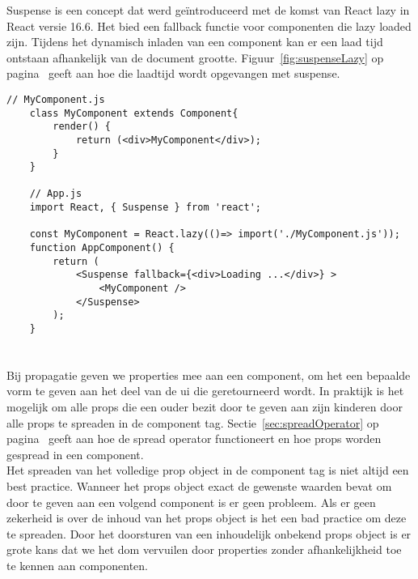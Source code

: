\subsubsection{}
\label{sec:suspens}

Suspense is een concept dat werd geïntroduceerd met de komst van React lazy in React versie 16.6. Het bied een fallback functie voor componenten die lazy loaded zijn. Tijdens het dynamisch inladen van een component kan er een laad tijd ontstaan afhankelijk van de document grootte. Figuur~\ref{fig:suspenseLazy} op pagina~\pageref{fig:suspenseLazy} geeft aan hoe die laadtijd wordt opgevangen met suspense.\\

\newpage
\begin{lstlisting}[caption=Lazy loading met suspense, label={fig:suspenseLazy}]
    // MyComponent.js
    class MyComponent extends Component{
        render() {
            return (<div>MyComponent</div>);
        }
    }
    
    // App.js
    import React, { Suspense } from 'react';
    
    const MyComponent = React.lazy(()=> import('./MyComponent.js'));
    function AppComponent() {
        return (
            <Suspense fallback={<div>Loading ...</div>} >
                <MyComponent />
            </Suspense>
        );
    }
\end{lstlisting}

\section{}
\label{sec:frameworkOplossingen}

\subsection{}
\label{sec:propagatie}

Bij propagatie geven we properties mee aan een component, om het een bepaalde vorm te geven aan het deel van de \gls{ui} die geretourneerd wordt. In praktijk is het mogelijk om alle props die een ouder bezit door te geven aan zijn kinderen door alle props te spreaden in de component tag. Sectie~\ref{sec:spreadOperator} op pagina~\pageref{sec:spreadOperator} geeft aan hoe de spread operator functioneert en hoe props worden gespread in een component.\\
Het spreaden van het volledige prop object in de component tag is niet altijd een best practice. Wanneer het props object exact de gewenste waarden bevat om door te geven aan een volgend component is er geen probleem. Als er geen zekerheid is over de inhoud van het props object is het een bad practice om deze te spreaden. Door het doorsturen van een inhoudelijk onbekend props object is er grote kans dat we het \gls{dom} vervuilen door properties zonder afhankelijkheid toe te kennen aan componenten.


